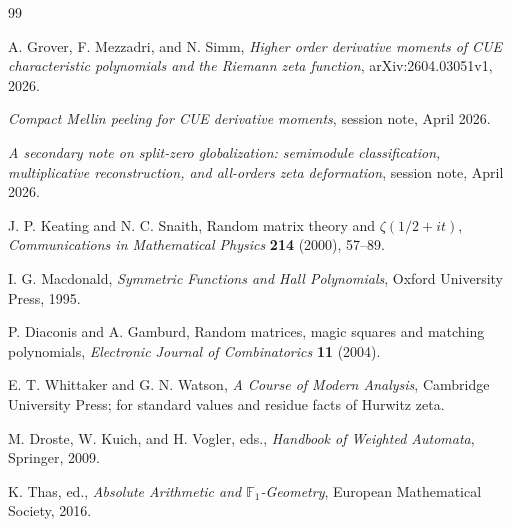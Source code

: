 \documentclass[11pt]{article}
\theoremstyle{plain}
\theoremstyle{definition}
\numberwithin{equation}{section}
\begin{document}
\begin{thebibliography}{99}

A. Grover, F. Mezzadri, and N. Simm,
\emph{Higher order derivative moments of CUE characteristic polynomials and the Riemann zeta function}, arXiv:2604.03051v1, 2026.

\emph{Compact Mellin peeling for CUE derivative moments}, session note, April 2026.

\emph{A secondary note on split-zero globalization: semimodule classification, multiplicative reconstruction, and all-orders zeta deformation}, session note, April 2026.

J. P. Keating and N. C. Snaith,
Random matrix theory and \(\zeta(1/2+it)\),
\emph{Communications in Mathematical Physics} \textbf{214} (2000), 57--89.

I. G. Macdonald,
\emph{Symmetric Functions and Hall Polynomials},
Oxford University Press, 1995.

P. Diaconis and A. Gamburd,
Random matrices, magic squares and matching polynomials,
\emph{Electronic Journal of Combinatorics} \textbf{11} (2004).

E. T. Whittaker and G. N. Watson,
\emph{A Course of Modern Analysis},
Cambridge University Press; for standard values and residue facts of Hurwitz zeta.

M. Droste, W. Kuich, and H. Vogler, eds.,
\emph{Handbook of Weighted Automata},
Springer, 2009.

K. Thas, ed.,
\emph{Absolute Arithmetic and \(\mathbb F_1\)-Geometry},
European Mathematical Society, 2016.

\end{thebibliography}
\end{document}
